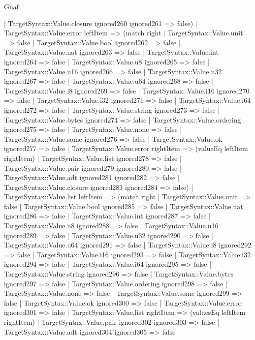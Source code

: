 \begin{lexlean}{Gnaf}
\begin{semanticmodule}
{      | TargetSyntax::Value.closure ignored260 ignored261 => false)
    | TargetSyntax::Value.error leftItem => (match right
      | TargetSyntax::Value.unit => false
      | TargetSyntax::Value.bool ignored262 => false
      | TargetSyntax::Value.nat ignored263 => false
      | TargetSyntax::Value.int ignored264 => false
      | TargetSyntax::Value.u8 ignored265 => false
      | TargetSyntax::Value.u16 ignored266 => false
      | TargetSyntax::Value.u32 ignored267 => false
      | TargetSyntax::Value.u64 ignored268 => false
      | TargetSyntax::Value.i8 ignored269 => false
      | TargetSyntax::Value.i16 ignored270 => false
      | TargetSyntax::Value.i32 ignored271 => false
      | TargetSyntax::Value.i64 ignored272 => false
      | TargetSyntax::Value.string ignored273 => false
      | TargetSyntax::Value.bytes ignored274 => false
      | TargetSyntax::Value.ordering ignored275 => false
      | TargetSyntax::Value.none => false
      | TargetSyntax::Value.some ignored276 => false
      | TargetSyntax::Value.ok ignored277 => false
      | TargetSyntax::Value.error rightItem => (valueEq leftItem rightItem)
      | TargetSyntax::Value.list ignored278 => false
      | TargetSyntax::Value.pair ignored279 ignored280 => false
      | TargetSyntax::Value.adt ignored281 ignored282 => false
      | TargetSyntax::Value.closure ignored283 ignored284 => false)
    | TargetSyntax::Value.list leftItem => (match right
      | TargetSyntax::Value.unit => false
      | TargetSyntax::Value.bool ignored285 => false
      | TargetSyntax::Value.nat ignored286 => false
      | TargetSyntax::Value.int ignored287 => false
      | TargetSyntax::Value.u8 ignored288 => false
      | TargetSyntax::Value.u16 ignored289 => false
      | TargetSyntax::Value.u32 ignored290 => false
      | TargetSyntax::Value.u64 ignored291 => false
      | TargetSyntax::Value.i8 ignored292 => false
      | TargetSyntax::Value.i16 ignored293 => false
      | TargetSyntax::Value.i32 ignored294 => false
      | TargetSyntax::Value.i64 ignored295 => false
      | TargetSyntax::Value.string ignored296 => false
      | TargetSyntax::Value.bytes ignored297 => false
      | TargetSyntax::Value.ordering ignored298 => false
      | TargetSyntax::Value.none => false
      | TargetSyntax::Value.some ignored299 => false
      | TargetSyntax::Value.ok ignored300 => false
      | TargetSyntax::Value.error ignored301 => false
      | TargetSyntax::Value.list rightItem => (valuesEq leftItem rightItem)
      | TargetSyntax::Value.pair ignored302 ignored303 => false
      | TargetSyntax::Value.adt ignored304 ignored305 => false
}
\end{semanticmodule}
\end{lexlean}

